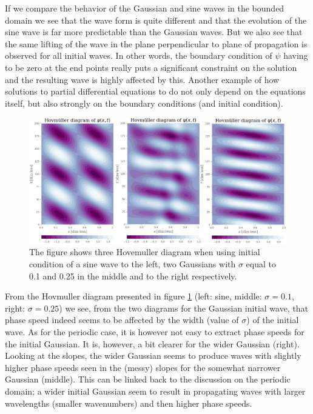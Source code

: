 \documentclass[12pt]{article}
\numberwithin{figure}{section}
\numberwithin{table}{section}
\begin{document}
\noindent If we compare the behavior of the Gaussian and sine waves in the bounded domain we see that the wave form is quite different and that the evolution of the sine wave is far more predictable than the Gaussian waves. But we also see that the same lifting of the wave in the plane perpendicular to plane of propagation is observed for all initial waves. In other words, the boundary condition of $\psi$ having to be zero at the end points really puts a significant constraint on the solution and the resulting wave is highly affected by this. Another example of how solutions to partial differential equations to do not only depend on the equations itself, but also strongly on the boundary conditions (and initial condition).\\ 

\begin{figure}[ht!]
 \centerline{\includegraphics[scale = 0.40]{hovmuller_basin_combined_2.png}}
 \caption{The figure shows three Hovemuller diagram when using initial condition of a sine wave to the left, two Gaussians with $\sigma$ equal to 0.1 and 0.25 in the middle and to the right respectively.}
 \label{fig:hovmuller_bassin}
\end{figure}



\noindent From the Hovmuller diagram presented in figure \ref{fig:hovmuller_bassin} (left: sine, middle: $\sigma=0.1$, right: $\sigma=0.25$) we see, from the two diagrams for the Gaussian initial wave, that phase speed indeed seems to be affected by the width (value of $\sigma$) of the initial wave. As for the periodic case, it is however not easy to extract phase speeds for the initial Gaussian. It is, however, a bit clearer for the wider Gaussian (right). Looking at the slopes, the wider Gaussian seems to produce waves with slightly higher phase speeds seen in the (messy) slopes for the somewhat narrower Gaussian (middle). This can be linked back to the discussion on the periodic domain; a wider initial Gaussian seem to result in propagating waves with larger wavelengths (smaller wavenumbers) and then higher phase speeds.
\end{document}
